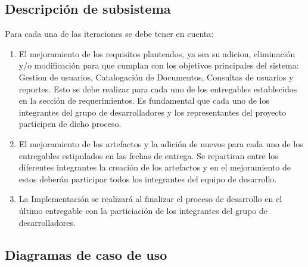 \documentclass[11pt]{article}
\begin{document}
        \subsection{Descripción de subsistema}
        Para cada una de las iteraciones se debe tener en cuenta:
        \begin{enumerate}
                \item El mejoramiento de los requisitos planteados, ya sea su adicion, eliminación
                y/o modificación para que cumplan con los objetivos principales del sistema:
                Gestion de usuarios, Catalogación de Documentos, Consultas de usuarios y reportes.
                Esto se debe realizar para cada uno de los entregables establecidos en la sección
                de requerimientos. Es fundamental que cada uno de los integrantes del grupo de
                desarrolladores y los representantes del proyecto participen de dicho proceso.
             
                \item El mejoramiento de los artefactos y la adición de nuevos para cada uno de los
                entregables estipulados en las fechas de entrega. Se repartiran entre los
                diferentes integrantes la creación de los artefactos y en el mejoramiento de estos
                deberán participar todos los integrantes del equipo de desarrollo.
                
                \item La Implementación se realizará al finalizar el proceso de desarrollo en el
                último entregable con la particiación de los integrantes del grupo de 
                desarrolladores.
        \end{enumerate}
        
        \subsection{Diagramas de caso de uso}
        
\end{document}
